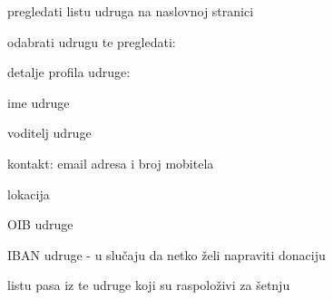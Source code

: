 		
		\begin{packed_enum}
			\item  {}
			
			\begin{packed_enum}
				
				\item pregledati listu udruga na naslovnoj stranici
				\item odabrati udrugu te pregledati: 
				\begin{packed_enum}
					
					\item  detalje profila udruge:
					\begin{packed_enum}
						\item ime udruge
						\item voditelj udruge
						\item kontakt: email adresa i broj mobitela
						\item lokacija
						\item OIB udruge
						\item IBAN udruge - u slučaju da netko želi napraviti donaciju
					\end{packed_enum}
					\item  listu pasa iz te udruge koji su raspoloživi za šetnju
				\end{packed_enum}
			

\end{packed_enum}
\end{packed_enum}
